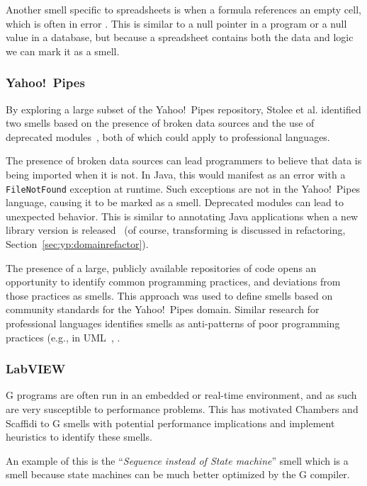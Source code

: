 \documentclass[10pt,conference,compsocconf]{IEEEtran}
\begin{document}
Another smell specific to spreadsheets is when a formula references an empty cell, which is often in error \cite{cunha2012towards}.
This is similar to a null pointer in a program or a null value in a database, but because a spreadsheet contains both the data and logic we can mark it as a smell.

\subsubsection{Yahoo!\ Pipes}
By exploring a large subset of the Yahoo!\ Pipes repository, Stolee et al. identified two smells based on the presence of broken data sources and the use of deprecated modules~\cite{StoleeTSE2013}, both of which could apply to professional languages.

The presence of broken data sources can lead programmers to believe that data is being imported when it is not.  In Java, this would manifest as an error with a {\tt FileNotFound} exception at runtime. Such exceptions are not in the Yahoo!\ Pipes language, causing it to be marked as a smell. 
Deprecated modules can lead to unexpected behavior. 
This is similar to annotating Java applications when a new library version is released~\cite{Tansey:2008:ARI:1449955.1449788} (of course, transforming is discussed in refactoring, Section~\ref{sec:yp:domainrefactor}).

The presence of a large, publicly available repositories of code opens an opportunity to identify common programming practices, and deviations from those practices as smells. This approach was used to define smells based on community standards for the Yahoo!\ Pipes domain. 
Similar research for professional languages identifies smells  as anti-patterns of poor programming practices (e.g., in UML~\cite{Enckevort:2009:RUM:1639950.1639959}, . 


\subsubsection{LabVIEW}

G programs are often run in an embedded or real-time environment, and as such are very susceptible to performance problems. This has motivated Chambers and Scaffidi \cite{chambers2013smell} to G smells with potential performance implications and implement heuristics to identify these smells.

An example of this is the ``\textit{Sequence instead of State machine}'' smell which is a smell because state machines can be much better optimized by the G compiler.
\end{document}
